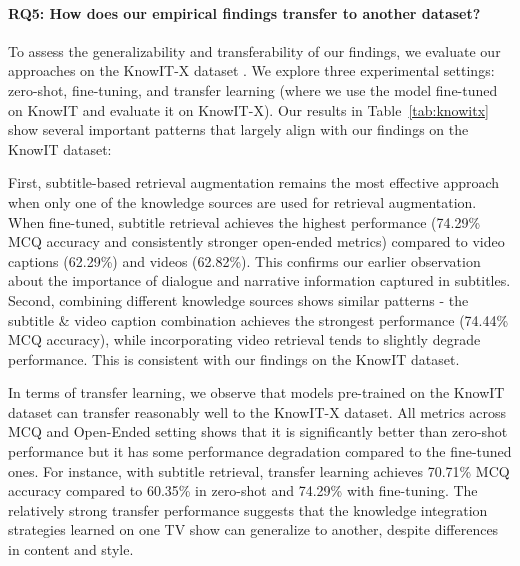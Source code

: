 \paragraph{\textbf{RQ5: How does our empirical findings transfer to another dataset?}}

To assess the generalizability and transferability of our findings, we evaluate our approaches on the KnowIT-X dataset \cite{wu2021transferring}. We explore three experimental settings: zero-shot, fine-tuning, and transfer learning (where we use the model fine-tuned on KnowIT and evaluate it on KnowIT-X). Our results in Table~\ref{tab:knowitx} show several important patterns that largely align with our findings on the KnowIT dataset:

First, subtitle-based retrieval augmentation remains the most effective approach when only one of the knowledge sources are used for retrieval augmentation. When fine-tuned, subtitle retrieval achieves the highest performance (74.29\% MCQ accuracy and consistently stronger open-ended metrics) compared to video captions (62.29\%) and videos (62.82\%). This confirms our earlier observation about the importance of dialogue and narrative information captured in subtitles. Second, combining different knowledge sources shows similar patterns - the subtitle \& video caption combination achieves the strongest performance (74.44\% MCQ accuracy), while incorporating video retrieval tends to slightly degrade performance. This is consistent with our findings on the KnowIT dataset.

In terms of transfer learning, we observe that models pre-trained on the KnowIT dataset can transfer reasonably well to the KnowIT-X dataset. All metrics across MCQ and Open-Ended setting shows that it is significantly better than zero-shot performance but it has some performance degradation compared to the fine-tuned ones. For instance, with subtitle retrieval, transfer learning achieves 70.71\% MCQ accuracy compared to 60.35\% in zero-shot and 74.29\% with fine-tuning. The relatively strong transfer performance suggests that the knowledge integration strategies learned on one TV show can generalize to another, despite differences in content and style. 


